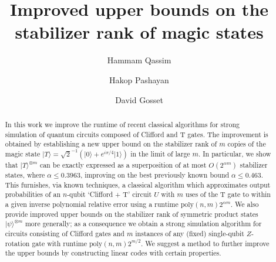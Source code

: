 \documentclass[a4paper,onecolumn,11pt,accepted=2021-11-11]{quantumarticle}
\newcommand{\ket}[1]{\ensuremath{\lvert #1 \rangle}}
\begin{document}
\title{Improved upper bounds on the stabilizer rank of magic states}


\author{Hammam Qassim }
\author{Hakop Pashayan}

\author{David Gosset}

\maketitle
\begin{abstract}
In this work we improve the runtime of recent classical algorithms for strong simulation of quantum circuits composed of Clifford and T gates. The improvement is obtained by establishing a new upper bound on the stabilizer rank of $m$ copies of the magic state $\ket{T}=\sqrt{2}^{-1}(\ket{0}+e^{i\pi/4}\ket{1})$ in the limit of large $m$. In particular, we show that $|T\rangle^{\otimes m}$ can be exactly expressed as a superposition of at most $O(2^{\alpha m})$ stabilizer states, where $\alpha\leq 0.3963$, improving on the best previously known bound $\alpha \leq 0.463$. 
This furnishes, via known techniques, a classical algorithm which approximates output probabilities of an $n$-qubit `Clifford + T' circuit $U$ with $m$ uses of the T gate to within a given inverse polynomial relative error using a runtime $\mathrm{poly}(n,m)2^{\alpha m}$. We also provide improved upper bounds on the stabilizer rank of symmetric product states $\ket{\psi}^{\otimes m}$ more generally; as a consequence we obtain a strong simulation algorithm for circuits consisting of Clifford gates and $m$ instances of any (fixed) single-qubit $Z$-rotation gate with runtime  $\text{poly}(n,m) 2^{m/2}$. We suggest a method to further improve the upper bounds by constructing linear codes with certain properties. 
\end{abstract}
\end{document}
